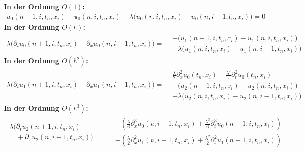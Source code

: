 \vspace{0.4cm}
\noindent \textbf{In der Ordnung $O(1)$:}
\begin{align}\label{eq:diskret:o1}
u_0(n+1, i, t_n, x_i) - u_0(n, i, t_n, x_i)
+ \lambda \bigl(u_0(n, i, t_n, x_i) - u_0(n, i-1, t_n, x_i) \bigr) = 0
\end{align}
\vspace{0.4cm}
\noindent \textbf{In der Ordnung $O(h)$:}
\begin{align}\label{eq:diskret:oh}
\lambda \bigl( \partial_t u_0(n+1, i, t_n, x_i) + \partial_x u_0(n, i-1, t_n, x_i) \bigr) =
\begin{split}
&- \bigl( u_1(n+1, i, t_n, x_i) - u_1(n, i, t_n, x_i) \bigr)\\
&- \lambda \bigl(u_1(n, i, t_n, x_i) - u_1(n, i-1, t_n, x_i) \bigr)
\end{split}
\end{align}
\vspace{0.4cm}
\noindent \textbf{In der Ordnung $O(h^2)$:}
\begin{align}\label{eq:diskret:oh2}
\lambda \bigl( \partial_t u_1(n+1, i, t_n, x_i) + \partial_x u_1(n, i-1, t_n, x_i) \bigr) =
\begin{split}
&\frac {\lambda}{2} \partial^2_x u_0(t_n, x_i) - \frac{\lambda^2}{2} \partial^2_t u_0(t_n, x_i)\\
&- \bigl( u_2(n+1, i, t_n, x_i) - u_2(n, i, t_n, x_i) \bigr)\\
&- \lambda \bigl(u_2(n, i, t_n, x_i) - u_2(n, i-1, t_n, x_i) \bigr)
\end{split}
\end{align}
\vspace{0.4cm}
\noindent \textbf{In der Ordnung $O(h^3)$:}
\begin{align}\label{eq:diskret:oh3}
\begin{split}
\lambda \bigl(\partial_t u_2(n+1, i, t_n, x_i)\qquad\\
\quad + \partial_x u_2(n, i-1, t_n, x_i) \bigr)
\end{split}
&= \begin{split}
- \left(\frac {\lambda}{6} \partial^3_x u_0(n, i-1, t_n, x_i) + \frac{\lambda^3}{6} \partial^3_t u_0(n+1, i, t_n, x_i)\right)\\
- \left(\frac {\lambda}{2} \partial^2_x u_1(n, i-1, t_n, x_i) + \frac{\lambda^2}{2} \partial^2_t u_1(n+1, i, t_n, x_i)\right)
\end{split}
\end{align}

